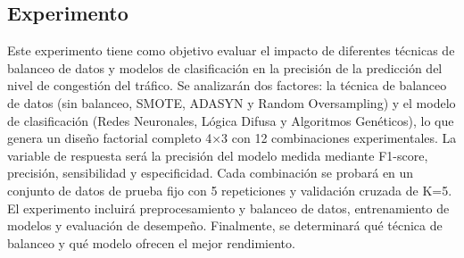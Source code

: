 \documentclass{svproc} %
\begin{document}
\subsection{Experimento}
Este experimento tiene como objetivo evaluar el impacto de diferentes técnicas de balanceo de datos y modelos de clasificación en la precisión de la predicción del nivel de congestión del tráfico. Se analizarán dos factores: la técnica de balanceo de datos (sin balanceo, SMOTE, ADASYN y Random Oversampling) y el modelo de clasificación (Redes Neuronales, Lógica Difusa y Algoritmos Genéticos), lo que genera un diseño factorial completo 4×3 con 12 combinaciones experimentales. La variable de respuesta será la precisión del modelo medida mediante F1-score, precisión, sensibilidad y especificidad. Cada combinación se probará en un conjunto de datos de prueba fijo con 5 repeticiones y validación cruzada de K=5. El experimento incluirá preprocesamiento y balanceo de datos, entrenamiento de modelos y evaluación de desempeño. Finalmente, se determinará qué técnica de balanceo y qué modelo ofrecen el mejor rendimiento.
\end{document}
